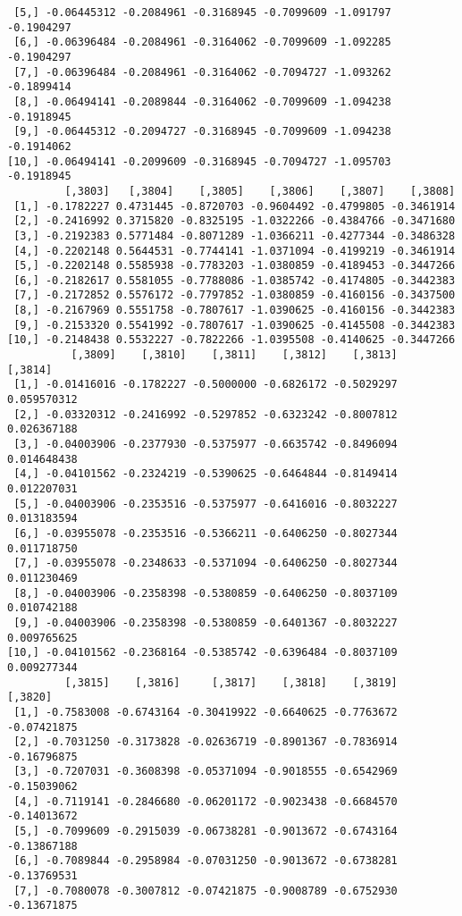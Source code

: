 \documentclass[
  letterpaper,
  DIV=11,
  numbers=noendperiod]{scrreprt}
\begin{document}
\begin{verbatim}
 [5,] -0.06445312 -0.2084961 -0.3168945 -0.7099609 -1.091797 -0.1904297
 [6,] -0.06396484 -0.2084961 -0.3164062 -0.7099609 -1.092285 -0.1904297
 [7,] -0.06396484 -0.2084961 -0.3164062 -0.7094727 -1.093262 -0.1899414
 [8,] -0.06494141 -0.2089844 -0.3164062 -0.7099609 -1.094238 -0.1918945
 [9,] -0.06445312 -0.2094727 -0.3168945 -0.7099609 -1.094238 -0.1914062
[10,] -0.06494141 -0.2099609 -0.3168945 -0.7094727 -1.095703 -0.1918945
         [,3803]   [,3804]    [,3805]    [,3806]    [,3807]    [,3808]
 [1,] -0.1782227 0.4731445 -0.8720703 -0.9604492 -0.4799805 -0.3461914
 [2,] -0.2416992 0.3715820 -0.8325195 -1.0322266 -0.4384766 -0.3471680
 [3,] -0.2192383 0.5771484 -0.8071289 -1.0366211 -0.4277344 -0.3486328
 [4,] -0.2202148 0.5644531 -0.7744141 -1.0371094 -0.4199219 -0.3461914
 [5,] -0.2202148 0.5585938 -0.7783203 -1.0380859 -0.4189453 -0.3447266
 [6,] -0.2182617 0.5581055 -0.7788086 -1.0385742 -0.4174805 -0.3442383
 [7,] -0.2172852 0.5576172 -0.7797852 -1.0380859 -0.4160156 -0.3437500
 [8,] -0.2167969 0.5551758 -0.7807617 -1.0390625 -0.4160156 -0.3442383
 [9,] -0.2153320 0.5541992 -0.7807617 -1.0390625 -0.4145508 -0.3442383
[10,] -0.2148438 0.5532227 -0.7822266 -1.0395508 -0.4140625 -0.3447266
          [,3809]    [,3810]    [,3811]    [,3812]    [,3813]     [,3814]
 [1,] -0.01416016 -0.1782227 -0.5000000 -0.6826172 -0.5029297 0.059570312
 [2,] -0.03320312 -0.2416992 -0.5297852 -0.6323242 -0.8007812 0.026367188
 [3,] -0.04003906 -0.2377930 -0.5375977 -0.6635742 -0.8496094 0.014648438
 [4,] -0.04101562 -0.2324219 -0.5390625 -0.6464844 -0.8149414 0.012207031
 [5,] -0.04003906 -0.2353516 -0.5375977 -0.6416016 -0.8032227 0.013183594
 [6,] -0.03955078 -0.2353516 -0.5366211 -0.6406250 -0.8027344 0.011718750
 [7,] -0.03955078 -0.2348633 -0.5371094 -0.6406250 -0.8027344 0.011230469
 [8,] -0.04003906 -0.2358398 -0.5380859 -0.6406250 -0.8037109 0.010742188
 [9,] -0.04003906 -0.2358398 -0.5380859 -0.6401367 -0.8032227 0.009765625
[10,] -0.04101562 -0.2368164 -0.5385742 -0.6396484 -0.8037109 0.009277344
         [,3815]    [,3816]     [,3817]    [,3818]    [,3819]     [,3820]
 [1,] -0.7583008 -0.6743164 -0.30419922 -0.6640625 -0.7763672 -0.07421875
 [2,] -0.7031250 -0.3173828 -0.02636719 -0.8901367 -0.7836914 -0.16796875
 [3,] -0.7207031 -0.3608398 -0.05371094 -0.9018555 -0.6542969 -0.15039062
 [4,] -0.7119141 -0.2846680 -0.06201172 -0.9023438 -0.6684570 -0.14013672
 [5,] -0.7099609 -0.2915039 -0.06738281 -0.9013672 -0.6743164 -0.13867188
 [6,] -0.7089844 -0.2958984 -0.07031250 -0.9013672 -0.6738281 -0.13769531
 [7,] -0.7080078 -0.3007812 -0.07421875 -0.9008789 -0.6752930 -0.13671875

\end{verbatim}
\end{document}
